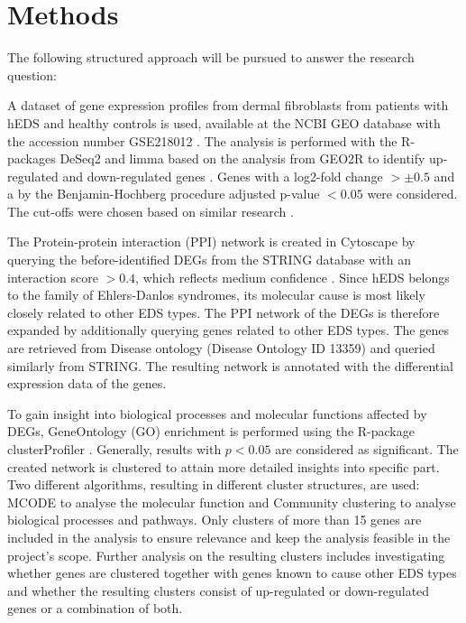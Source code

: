 \section{Methods}
The following structured approach will be pursued to answer the research question:

\begin{description}[leftmargin=5pt]
	\item [Analysis of Differentially Expressed Genes (DEGs).]\label{sec:methods-deg}A dataset of gene expression profiles from dermal fibroblasts from patients with hEDS and healthy controls is used, available at the NCBI GEO database with the accession number GSE218012 \cite{Ritelli2020}. The analysis is performed with the R-packages DeSeq2 and limma based on the analysis from GEO2R to identify up-regulated and down-regulated genes \cite{DESeq2, limma}. Genes with a log2-fold change $> \pm 0.5$ and a by the Benjamin-Hochberg procedure adjusted p-value $< 0.05$ were considered. The cut-offs were chosen based on similar research \cite{Karimizadeh2019, Lim2019}.

	\item[Network Creation.] The Protein-protein interaction (PPI) network is created in Cytoscape \cite{Cytoscape} by querying the before-identified DEGs from the STRING database with an interaction score $> 0.4$, which reflects medium confidence \cite{StringDB}. Since hEDS belongs to the family of Ehlers-Danlos syndromes, its molecular cause is most likely closely related to other EDS types. The PPI network of the DEGs is therefore expanded by additionally querying genes related to other EDS types. The genes are retrieved from Disease ontology (Disease Ontology ID 13359) \cite{DO} and queried similarly from STRING. The resulting network is annotated with the differential expression data of the genes.
	
	\item[Gene Ontology and Clustering.]To gain insight into biological processes and molecular functions affected by DEGs, GeneOntology (GO) enrichment is performed using the R-package clusterProfiler \cite{Ashburner2000,Consortium2023, Wu2021}. Generally, results with $p < 0.05$ are considered as significant. The created network is clustered to attain more detailed insights into specific part. Two different algorithms, resulting in different cluster structures, are used: MCODE to analyse the molecular function and Community clustering to analyse biological processes and pathways. Only clusters of more than 15 genes are included in the analysis to ensure relevance and keep the analysis feasible in the project's scope. Further analysis on the resulting clusters includes investigating whether genes are clustered together with genes known to cause other EDS types and whether the resulting clusters consist of up-regulated or down-regulated genes or a combination of both.
	

\end{description}
